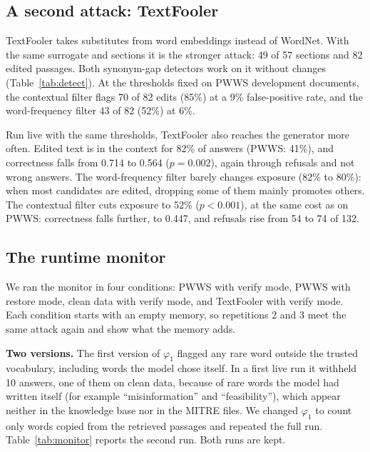 \documentclass[10pt,journal,compsoc]{IEEEtran}
\begin{document}
\subsection{A second attack: TextFooler}\label{sec:textfooler}
TextFooler takes substitutes from word embeddings instead of WordNet. With the same surrogate and sections it is the stronger attack: 49 of 57 sections and 82 edited passages. Both synonym-gap detectors work on it without changes (Table~\ref{tab:detect}). At the thresholds fixed on PWWS development documents, the contextual filter flags 70 of 82 edits (85\%) at a 9\% false-positive rate, and the word-frequency filter 43 of 82 (52\%) at 6\%.

Run live with the same thresholds, TextFooler also reaches the generator more often. Edited text is in the context for 82\% of answers (PWWS: 41\%), and correctness falls from 0.714 to 0.564 ($p=0.002$), again through refusals and not wrong answers. The word-frequency filter barely changes exposure (82\% to 80\%): when most candidates are edited, dropping some of them mainly promotes others. The contextual filter cuts exposure to 52\% ($p<0.001$), at the same cost as on PWWS: correctness falls further, to 0.447, and refusals rise from 54 to 74 of 132.

\subsection{The runtime monitor}\label{sec:monitor}
We ran the monitor in four conditions: PWWS with verify mode, PWWS with restore mode, clean data with verify mode, and TextFooler with verify mode. Each condition starts with an empty memory, so repetitions 2 and 3 meet the same attack again and show what the memory adds.

\textbf{Two versions.} The first version of $\varphi_1$ flagged any rare word outside the trusted vocabulary, including words the model chose itself. In a first live run it withheld 10 answers, one of them on clean data, because of rare words the model had written itself (for example ``misinformation'' and ``feasibility''), which appear neither in the knowledge base nor in the MITRE files. We changed $\varphi_1$ to count only words copied from the retrieved passages and repeated the full run. Table~\ref{tab:monitor} reports the second run. Both runs are kept.
\end{document}
